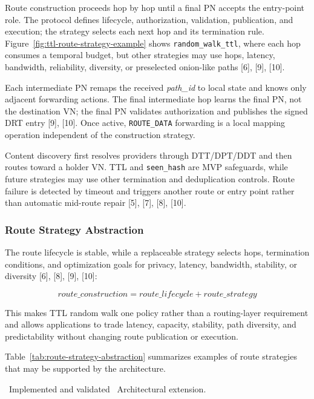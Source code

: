 \documentclass[12pt]{article}
\newcommand{\statusvalidated}{\textcolor{green!50!black}{\ding{51}}}
\newcommand{\statusproposed}{\textcolor{blue!70!black}{\ding{117}}}
\begin{document}
\thesisroutestrategyconstructiontikz

\thesishopbyhoptikz

Route construction proceeds hop by hop until a final PN accepts the entry-point role. The protocol defines lifecycle, authorization, validation, publication, and execution; the strategy selects each next hop and its termination rule. Figure~\ref{fig:ttl-route-strategy-example} shows \texttt{random\_walk\_ttl}, where each hop consumes a temporal budget, but other strategies may use hops, latency, bandwidth, reliability, diversity, or preselected onion-like paths [6], [9], [10].

Each intermediate PN remaps the received \textit{path\_id} to local state and knows only adjacent forwarding actions. The final intermediate hop learns the final PN, not the destination VN; the final PN validates authorization and publishes the signed DRT entry [9], [10]. Once active, \texttt{ROUTE\_DATA} forwarding is a local mapping operation independent of the construction strategy.

Content discovery first resolves providers through DTT/DPT/DDT and then routes toward a holder VN. TTL and \texttt{seen\_hash} are MVP safeguards, while future strategies may use other termination and deduplication controls. Route failure is detected by timeout and triggers another route or entry point rather than automatic mid-route repair [5], [7], [8], [10].

\subsubsection{Route Strategy Abstraction}
\label{subsubsec:route-strategy-abstraction}

The route lifecycle is stable, while a replaceable strategy selects hops, termination conditions, and optimization goals for privacy, latency, bandwidth, stability, or diversity [6], [8], [9], [10]:

\[
route\_construction = route\_lifecycle + route\_strategy
\]

This makes TTL random walk one policy rather than a routing-layer requirement and allows applications to trade latency, capacity, stability, path diversity, and predictability without changing route publication or execution.

Table~\ref{tab:route-strategy-abstraction} summarizes examples of route strategies
that may be supported by the architecture.

\noindent\statusvalidated~Implemented and validated \quad
\statusproposed~Architectural extension.
\end{document}
